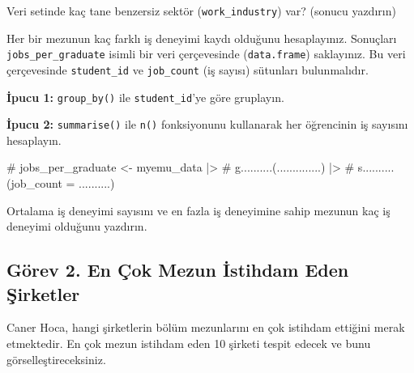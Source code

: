\documentclass[
  11pt,
  a4paper,
  DIV=11,
  numbers=noendperiod]{scrartcl}
\newenvironment{Shaded}{\begin{snugshade}}{\end{snugshade}}
\newcommand{\CommentTok}[1]{\textcolor[rgb]{0.37,0.37,0.37}{#1}}
\begin{document}
Veri setinde kaç tane benzersiz sektör (\texttt{work\_industry}) var?
(sonucu yazdırın)

\begin{Shaded}
\end{Shaded}

Her bir mezunun kaç farklı iş deneyimi kaydı olduğunu hesaplayınız.
Sonuçları \texttt{jobs\_per\_graduate} isimli bir veri çerçevesinde
(\texttt{data.frame}) saklayınız. Bu veri çerçevesinde
\texttt{student\_id} ve \texttt{job\_count} (iş sayısı) sütunları
bulunmalıdır.

\textbf{İpucu 1:} \texttt{group\_by()} ile \texttt{student\_id}'ye göre
gruplayın.

\textbf{İpucu 2:} \texttt{summarise()} ile \texttt{n()} fonksiyonunu
kullanarak her öğrencinin iş sayısını hesaplayın.

\begin{Shaded}
\begin{Highlighting}[]
\CommentTok{\# jobs\_per\_graduate \textless{}{-} myemu\_data |\textgreater{}}
\CommentTok{\#   g..........(..............) |\textgreater{}}
\CommentTok{\#   s..........(job\_count = ..........)}
\end{Highlighting}
\end{Shaded}

Ortalama iş deneyimi sayısını ve en fazla iş deneyimine sahip mezunun
kaç iş deneyimi olduğunu yazdırın.

\begin{Shaded}
\end{Shaded}

\subsection{Görev 2. En Çok Mezun İstihdam Eden
Şirketler}\label{guxf6rev-2.-en-uxe7ok-mezun-istihdam-eden-ux15firketler}

Caner Hoca, hangi şirketlerin bölüm mezunlarını en çok istihdam ettiğini
merak etmektedir. En çok mezun istihdam eden 10 şirketi tespit edecek ve
bunu görselleştireceksiniz.
\end{document}
